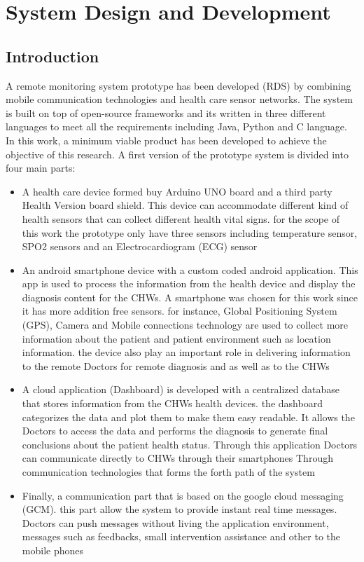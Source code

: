 \chapter{System Design and Development}
\section{Introduction}
A remote monitoring system prototype has been developed (RDS) by combining mobile communication technologies and health care sensor networks. The system is built on top of open-source frameworks and its written in three different languages to meet all the requirements including Java, Python and C language. In this work, a minimum viable product has been developed to achieve the objective of this research. A first version of the prototype system is divided into four main parts:
\begin{itemize}
	\item{A health care device formed buy Arduino UNO board and a third party Health Version board shield. This device can accommodate different kind of health sensors that can collect different health vital signs. for the scope of this work the prototype only have three sensors including temperature sensor, SPO2 sensors and an Electrocardiogram (ECG) sensor}
	\item{An android smartphone device with a custom coded android application. This app is used to process the information from the health device and display the diagnosis content for the CHWs. A smartphone was chosen for this work since it has more addition free sensors. for instance, Global Positioning System (GPS), Camera and Mobile connections technology are used to collect more information about the patient and patient environment such as location information. the device also play an important role in delivering information to the remote Doctors for remote diagnosis and as well as to the CHWs}
	\item{A cloud application (Dashboard) is developed with a centralized database that stores information from the CHWs health devices. the dashboard categorizes the data and plot them to make them easy readable. It allows the Doctors to access the data and performs the diagnosis to generate final conclusions about the patient health status. Through this application Doctors can communicate directly to CHWs through their smartphones Through communication technologies that forms the forth path of the system}
	\item{
Finally, a communication part that is based on the google cloud messaging (GCM). this part allow the system to provide instant real time messages. Doctors can push messages without living the application environment, messages such as feedbacks, small intervention assistance and other to the mobile phones}
\end{itemize}

